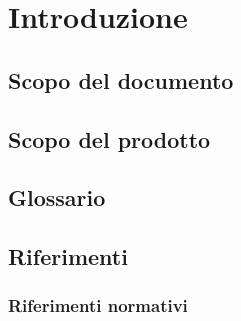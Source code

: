 \documentclass[main.tex]{subfiles}
\begin{document}
\chapter{Introduzione}
\section{Scopo del documento}
\section{Scopo del prodotto}
\section{Glossario}
\section{Riferimenti}
\subsection{Riferimenti normativi}
\end{document}
